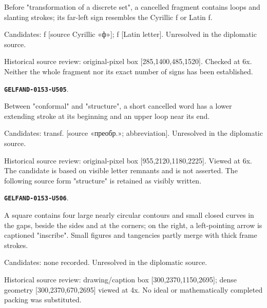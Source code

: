 \documentclass[11pt]{article}
\theoremstyle{definition}
\theoremstyle{remark}
\begin{document}
Before "transformation of a discrete set", a cancelled fragment contains loops and slanting strokes; its far-left sign resembles the Cyrillic f or Latin f.\par
Candidates: f [source Cyrillic «ф»]; f [Latin letter]. Unresolved in the diplomatic source.\par
Historical source review: original-pixel box [285,1400,485,1520]. Checked at 6x. Neither the whole fragment nor its exact number of signs has been established.\par\medskip
\par\noindent\leavevmode{}\label{GELFAND-0153-U505}\label{GELFAND-P001410:structure-cancellation:note}\textbf{\texttt{GELFAND-0153-U505}}.\nopagebreak[4]\par
Between "conformal" and "structure", a short cancelled word has a lower extending stroke at its beginning and an upper loop near its end.\par
Candidates: transf. [source «преобр.»; abbreviation]. Unresolved in the diplomatic source.\par
Historical source review: original-pixel box [955,2120,1180,2225]. Viewed at 6x. The candidate is based on visible letter remnants and is not asserted. The following source form "structure" is retained as visibly written.\par\medskip
\par\noindent\leavevmode{}\label{GELFAND-0153-U506}\label{GELFAND-P001410:circle-packing:note}\textbf{\texttt{GELFAND-0153-U506}}.\nopagebreak[4]\par
A square contains four large nearly circular contours and small closed curves in the gaps, beside the sides and at the corners; on the right, a left-pointing arrow is captioned "inscribe". Small figures and tangencies partly merge with thick frame strokes.\par
Candidates: none recorded. Unresolved in the diplomatic source.\par
Historical source review: drawing/caption box [300,2370,1150,2695]; dense geometry [300,2370,670,2695] viewed at 4x. No ideal or mathematically completed packing was substituted.\par\medskip
\end{document}

